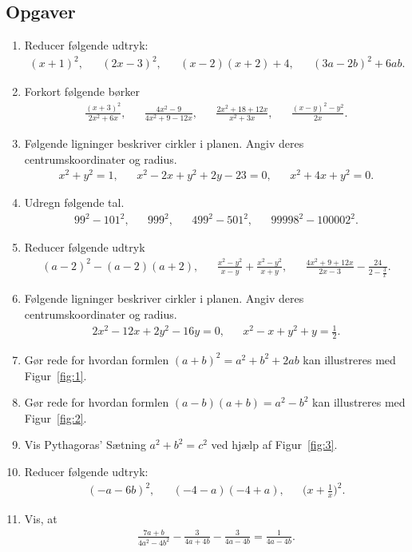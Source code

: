 \subsection{Opgaver}

\begin{enumerate}
\item Reducer følgende udtryk:
\begin{align*}
(x+1)^2,&& (2x-3)^2,&& (x-2)(x+2)+4,&& (3a-2b)^2+6ab.
\end{align*}
\item Forkort følgende børker
\begin{align*}
\frac{(x+3)^2}{2x^2+6x},&& \frac{4x^2-9}{4x^2+9-12x},&& \frac{2x^2+18+12x}{x^2+3x},&& \frac{(x-y)^2-y^2}{2x}.
\end{align*}
\item Følgende ligninger beskriver cirkler i planen. Angiv deres centrumskoordinater og radius.
\begin{align*}
x^2+y^2=1,&& x^2-2x+y^2+2y-23=0,&& x^2+4x+y^2=0.
\end{align*}
\item Udregn følgende tal.
\begin{align*}
99^2-101^2,&& 999^2,&& 499^2-501^2,&& 99998^2-100002^2.
\end{align*}
\item Reducer følgende udtryk
\begin{align*}
(a-2)^2-(a-2)(a+2),&& \frac{x^2-y^2}{x-y}+\frac{x^2-y^2}{x+y},&&\frac{ 4x^2+9+12x}{2x-3}-\frac{24}{2- \frac{3}{x}}.
\end{align*}
\item Følgende ligninger beskriver cirkler i planen. Angiv deres centrumskoordinater og radius.
\begin{align*}
2x^2-12x+2y^2-16y=0,&& x^2-x+y^2+y=\frac{1}{2}.
\end{align*}
\item \label{it:1} Gør rede for hvordan formlen $(a+b)^2=a^2+b^2+2ab$ kan illustreres med Figur~\ref{fig:1}.
\item \label{it:2} Gør rede for hvordan formlen $(a-b)(a+b)=a^2-b^2$ kan illustreres med Figur~\ref{fig:2}.
\item \label{it:3} Vis Pythagoras' Sætning $a^2+b^2=c^2$ ved hjælp af Figur~\ref{fig:3}.

\item \label{it:ex13} Reducer følgende udtryk:
\begin{align*}
(-a-6b)^2,&& (-4-a)(-4+a),&& \Big(x+\frac{1}{x}\Big)^2.
\end{align*}
\item Vis, at
\begin{align*}
\frac{7a +b}{4a^2-4b^2}-\frac{3}{4a+4b}-\frac{3}{4a-4b}=\frac{1}{4a-4b}.
\end{align*}


\end{enumerate}
